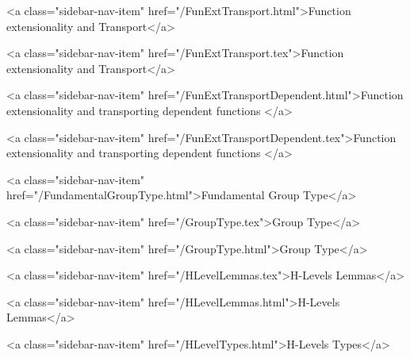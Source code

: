       
    
      
        
          <a class="sidebar-nav-item" href="/FunExtTransport.html">Function extensionality and Transport</a>
        
      
    
      
        
          <a class="sidebar-nav-item" href="/FunExtTransport.tex">Function extensionality and Transport</a>
        
      
    
      
        
          <a class="sidebar-nav-item" href="/FunExtTransportDependent.html">Function extensionality and transporting dependent functions </a>
        
      
    
      
        
          <a class="sidebar-nav-item" href="/FunExtTransportDependent.tex">Function extensionality and transporting dependent functions </a>
        
      
    
      
        
          <a class="sidebar-nav-item" href="/FundamentalGroupType.html">Fundamental Group Type</a>
        
      
    
      
        
          <a class="sidebar-nav-item" href="/GroupType.tex">Group Type</a>
        
      
    
      
        
          <a class="sidebar-nav-item" href="/GroupType.html">Group Type</a>
        
      
    
      
        
          <a class="sidebar-nav-item" href="/HLevelLemmas.tex">H-Levels Lemmas</a>
        
      
    
      
        
          <a class="sidebar-nav-item" href="/HLevelLemmas.html">H-Levels Lemmas</a>
        
      
    
      
        
          <a class="sidebar-nav-item" href="/HLevelTypes.html">H-Levels Types</a>
        
      
    
